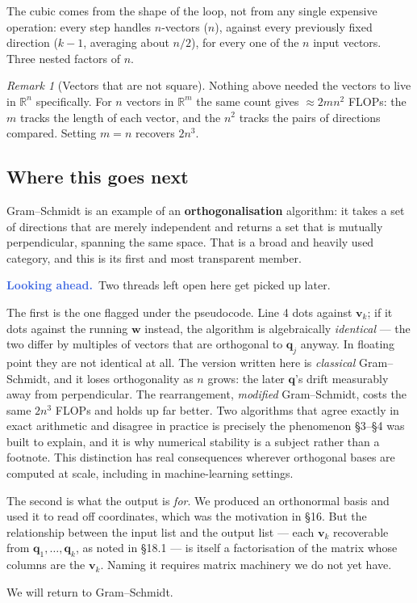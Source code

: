 \documentclass[11pt]{article}
\theoremstyle{plain}
\theoremstyle{definition}
\theoremstyle{remark}
\newtheorem*{rmk}{Remark}
\newcommand{\lookahead}{\par\smallskip\noindent
  \textbf{\sffamily\textcolor{RoyalBlue}{Looking ahead.}}\ \ignorespaces}
\newcommand{\R}{\mathbb{R}}
\newcommand{\vc}[1]{\mathbf{#1}}
\begin{document}
\noindent The cubic comes from the shape of the loop, not from any single
expensive operation: every step handles $n$-vectors ($n$), against every
previously fixed direction ($k-1$, averaging about $n/2$), for every one of the
$n$ input vectors. Three nested factors of $n$.

\begin{rmk}[Vectors that are not square]
Nothing above needed the vectors to live in $\R^{n}$ specifically. For $n$
vectors in $\R^{m}$ the same count gives $\approx 2mn^{2}$ FLOPs: the $m$ tracks
the length of each vector, and the $n^{2}$ tracks the pairs of directions
compared. Setting $m=n$ recovers $2n^{3}$.
\end{rmk}

\subsection{Where this goes next}
Gram--Schmidt is an example of an \textbf{orthogonalisation} algorithm: it takes
a set of directions that are merely independent and returns a set that is
mutually perpendicular, spanning the same space. That is a broad and heavily used
category, and this is its first and most transparent member.

\lookahead Two threads left open here get picked up later.

The first is the one flagged under the pseudocode. Line 4 dots against
$\vc{v}_{k}$; if it dots against the running $\vc{w}$ instead, the algorithm is
algebraically \emph{identical} --- the two differ by multiples of vectors that
are orthogonal to $\vc{q}_{j}$ anyway. In floating point they are not identical
at all. The version written here is \emph{classical} Gram--Schmidt, and it loses
orthogonality as $n$ grows: the later $\vc{q}$'s drift measurably away from
perpendicular. The rearrangement, \emph{modified} Gram--Schmidt, costs the same
$2n^{3}$ FLOPs and holds up far better. Two algorithms that agree exactly in
exact arithmetic and disagree in practice is precisely the phenomenon \S3--\S4
was built to explain, and it is why numerical stability is a subject rather than
a footnote. This distinction has real consequences wherever orthogonal bases are
computed at scale, including in machine-learning settings.

The second is what the output is \emph{for}. We produced an orthonormal basis
and used it to read off coordinates, which was the motivation in \S16. But the
relationship between the input list and the output list --- each $\vc{v}_{k}$
recoverable from $\vc{q}_{1},\dots,\vc{q}_{k}$, as noted in \S18.1 --- is itself
a factorisation of the matrix whose columns are the $\vc{v}_{k}$. Naming it
requires matrix machinery we do not yet have.

We will return to Gram--Schmidt.
\end{document}
